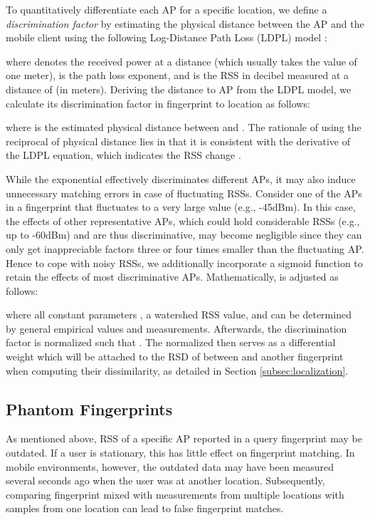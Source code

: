 \documentclass[10pt,conference,compsocconf,letterpaper]{./sty/IEEEtran}
\newcommand{\term}[1]{{\it #1}}
\newcommand{\rev}[1]{{\color{blue}#1}} \newcommand{\com}[1]{\textbf{\color{red}(COMMENT: #1)}} \else
\newcommand{\rev}[1]{#1}
\newcommand{\com}[1]{}
\begin{document}
To quantitatively differentiate each AP for a specific location, we define a \term{discrimination factor} by estimating the physical distance between the AP and the mobile client using the following Log-Distance Path Loss (LDPL) model \cite{rappaport1996wireless}:

where  denotes the received power at a distance  (which usually takes the value of one meter),  is the path loss exponent, and  is the RSS in decibel measured at a distance of  (in meters). Deriving the distance to AP  from the LDPL model, we calculate its discrimination factor in fingerprint  to location  as follows:

where  is the estimated physical distance between  and . The rationale of using the reciprocal of physical distance lies in \rev{that it is consistent with the derivative of the LDPL equation, which indicates the RSS change . } 

While the exponential  effectively discriminates different APs, it may also induce unnecessary matching errors in case of fluctuating RSSs. 
Consider one of the APs in a fingerprint that fluctuates to a very large value (e.g., -45dBm). In this case, the effects of other representative APs, which could hold considerable RSSs (e.g., up to -60dBm) and are thus discriminative, may become negligible since they can only get inappreciable factors three or four times smaller than the fluctuating AP. 
Hence to cope with noisy RSSs, we additionally incorporate a sigmoid function to retain the effects of most discriminative APs. Mathematically,  is adjusted as follows:

where all constant parameters , a watershed RSS value,  and  can be determined by general empirical values and measurements. Afterwards, the discrimination factor is normalized such that . 
The normalized  then serves as a differential weight which will be attached to the RSD of  between  and another fingerprint when computing their dissimilarity, as detailed in Section \ref{subsec:localization}. 



\subsection{Phantom Fingerprints}

As mentioned above, RSS of a specific AP reported in a query fingerprint may be outdated. If a user is stationary, this has little effect on fingerprint matching. In mobile environments, however, the outdated data may have been measured several seconds ago when the user was at another location. Subsequently, comparing fingerprint mixed with measurements from multiple locations with samples from one location can lead to false fingerprint matches. 
\end{document}
